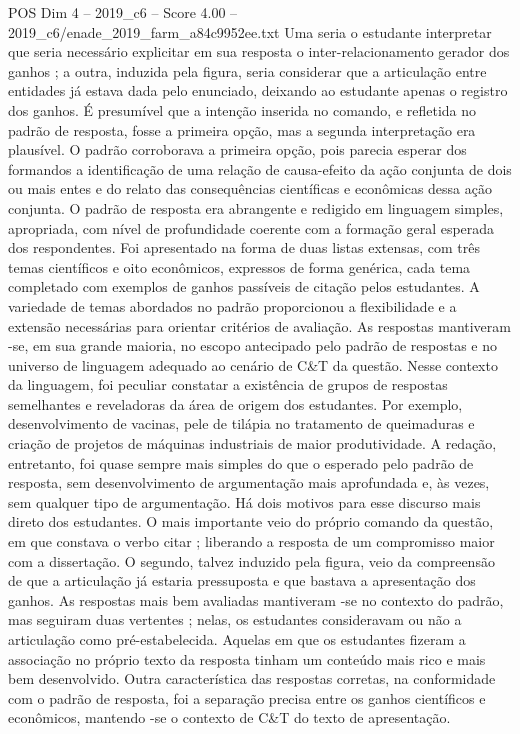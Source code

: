 \begin{textsample}{POS Dim 4 – 2019\_c6 – Score 4.00 – 2019\_c6/enade\_2019\_farm\_a84c9952ee.txt}
Uma seria o estudante interpretar que seria necessário explicitar em sua resposta o inter-relacionamento gerador dos ganhos ; a outra, induzida pela figura, seria considerar que a articulação entre entidades já estava dada pelo enunciado, deixando ao estudante apenas o registro dos ganhos.
É presumível que a intenção inserida no comando, e refletida no padrão de resposta, fosse a primeira opção, mas a segunda interpretação era plausível.
O padrão corroborava a primeira opção, pois parecia esperar dos formandos a identificação de uma relação de causa-efeito da ação conjunta de dois ou mais entes e do relato das consequências científicas e econômicas dessa ação conjunta.
O padrão de resposta era abrangente e redigido em linguagem simples, apropriada, com nível de profundidade coerente com a formação geral esperada dos respondentes.
Foi apresentado na forma de duas listas extensas, com três temas científicos e oito econômicos, expressos de forma genérica, cada tema completado com exemplos de ganhos passíveis de citação pelos estudantes.
A variedade de temas abordados no padrão proporcionou a flexibilidade e a extensão necessárias para orientar critérios de avaliação.
As respostas mantiveram -se, em sua grande maioria, no escopo antecipado pelo padrão de respostas e no universo de linguagem adequado ao cenário de C\&T da questão.
Nesse contexto da linguagem, foi peculiar constatar a existência de grupos de respostas semelhantes e reveladoras da área de origem dos estudantes.
Por exemplo, desenvolvimento de vacinas, pele de tilápia no tratamento de queimaduras e criação de projetos de máquinas industriais de maior produtividade.
A redação, entretanto, foi quase sempre mais simples do que o esperado pelo padrão de resposta, sem desenvolvimento de argumentação mais aprofundada e, às vezes, sem qualquer tipo de argumentação.
Há dois motivos para esse discurso mais direto dos estudantes.
O mais importante veio do próprio comando da questão, em que constava o verbo citar ; liberando a resposta de um compromisso maior com a dissertação.
O segundo, talvez induzido pela figura, veio da compreensão de que a articulação já estaria pressuposta e que bastava a apresentação dos ganhos.
As respostas mais bem avaliadas mantiveram -se no contexto do padrão, mas seguiram duas vertentes ; nelas, os estudantes consideravam ou não a articulação como pré-estabelecida.
Aquelas em que os estudantes fizeram a associação no próprio texto da resposta tinham um conteúdo mais rico e mais bem desenvolvido.
Outra característica das respostas corretas, na conformidade com o padrão de resposta, foi a separação precisa entre os ganhos científicos e econômicos, mantendo -se o contexto de C\&T do texto de apresentação.

\end{textsample}

